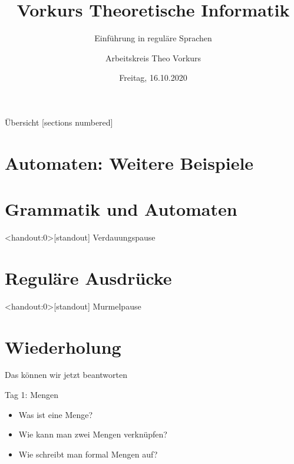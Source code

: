 

\title{Vorkurs Theoretische Informatik}
\subtitle{Einführung in reguläre Sprachen}
\date{Freitag, 16.10.2020}
\author{Arbeitskreis  Theo Vorkurs}



\maketitle

\begin{frame}[fragile]{Übersicht}
    [sections numbered]
    \tableofcontents%
\end{frame}

\section{Automaten: Weitere Beispiele}



\section{Grammatik und Automaten}



\begin{frame}<handout:0>[standout]
    Verdauungspause
\end{frame}

\section{Reguläre Ausdrücke}



\begin{frame}<handout:0>[standout]
    Murmelpause
\end{frame}

\section{Wiederholung}
\begin{frame}[fragile]{Das können wir jetzt beantworten}
    \begin{alertblock}{Tag 1: Mengen}
        \begin{itemize}
            \item Was ist eine Menge?
            \item Wie kann man zwei Mengen verknüpfen?
            \item Wie schreibt man formal Mengen auf?
        \end{itemize}
    \end{alertblock}
\end{frame}

